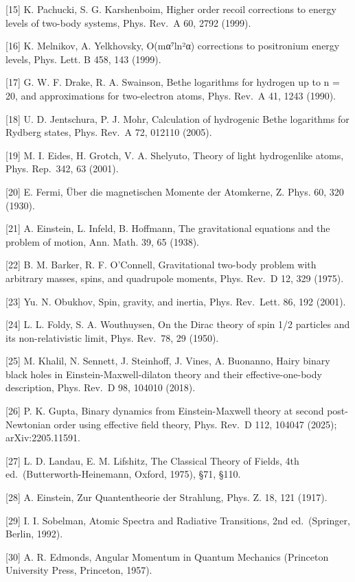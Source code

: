 \documentclass[
  a4paper,
]{ltjsarticle}
\begin{document}
{[}15{]} K. Pachucki, S. G. Karshenboim, Higher order recoil corrections
to energy levels of two-body systems, Phys. Rev.~A 60, 2792 (1999).

{[}16{]} K. Melnikov, A. Yelkhovsky, O(mα⁷ln²α) corrections to
positronium energy levels, Phys. Lett. B 458, 143 (1999).

{[}17{]} G. W. F. Drake, R. A. Swainson, Bethe logarithms for hydrogen
up to n = 20, and approximations for two-electron atoms, Phys. Rev.~A
41, 1243 (1990).

{[}18{]} U. D. Jentschura, P. J. Mohr, Calculation of hydrogenic Bethe
logarithms for Rydberg states, Phys. Rev.~A 72, 012110 (2005).

{[}19{]} M. I. Eides, H. Grotch, V. A. Shelyuto, Theory of light
hydrogenlike atoms, Phys. Rep.~342, 63 (2001).

{[}20{]} E. Fermi, Über die magnetischen Momente der Atomkerne, Z. Phys.
60, 320 (1930).

{[}21{]} A. Einstein, L. Infeld, B. Hoffmann, The gravitational
equations and the problem of motion, Ann. Math. 39, 65 (1938).

{[}22{]} B. M. Barker, R. F. O'Connell, Gravitational two-body problem
with arbitrary masses, spins, and quadrupole moments, Phys. Rev.~D 12,
329 (1975).

{[}23{]} Yu. N. Obukhov, Spin, gravity, and inertia, Phys. Rev.~Lett.
86, 192 (2001).

{[}24{]} L. L. Foldy, S. A. Wouthuysen, On the Dirac theory of spin 1/2
particles and its non-relativistic limit, Phys. Rev.~78, 29 (1950).

{[}25{]} M. Khalil, N. Sennett, J. Steinhoff, J. Vines, A. Buonanno,
Hairy binary black holes in Einstein-Maxwell-dilaton theory and their
effective-one-body description, Phys. Rev.~D 98, 104010 (2018).

{[}26{]} P. K. Gupta, Binary dynamics from Einstein-Maxwell theory at
second post-Newtonian order using effective field theory, Phys. Rev.~D
112, 104047 (2025); arXiv:2205.11591.

{[}27{]} L. D. Landau, E. M. Lifshitz, The Classical Theory of Fields,
4th ed.~(Butterworth-Heinemann, Oxford, 1975), §71, §110.

{[}28{]} A. Einstein, Zur Quantentheorie der Strahlung, Phys. Z. 18, 121
(1917).

{[}29{]} I. I. Sobelman, Atomic Spectra and Radiative Transitions, 2nd
ed.~(Springer, Berlin, 1992).

{[}30{]} A. R. Edmonds, Angular Momentum in Quantum Mechanics (Princeton
University Press, Princeton, 1957).
\end{document}
